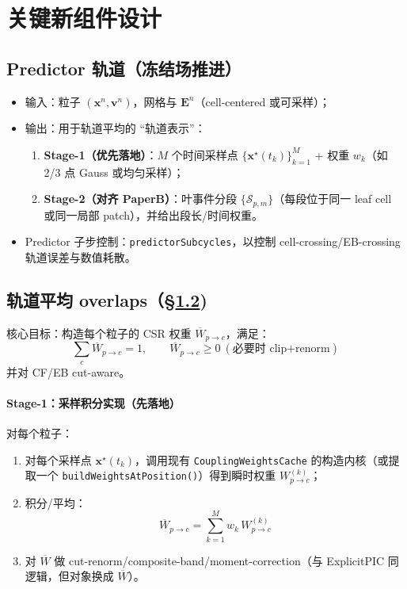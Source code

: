 \documentclass[UTF8,a4paper,12pt]{ctexart}
\newcommand{\code}[1]{\texttt{#1}}
\begin{document}
\section{关键新组件设计}
\label{sec:keycomponents}

\subsection{Predictor 轨道（冻结场推进）}
\begin{itemize}[leftmargin=2em]
  \item 输入：粒子 $(\bm{x}^n,\bm{v}^n)$，网格与 $\bm{E}^n$（cell-centered 或可采样）；
  \item 输出：用于轨道平均的 ``轨道表示''：
  \begin{enumerate}[leftmargin=2em]
    \item \textbf{Stage-1（优先落地）}：$M$ 个时间采样点 $\{\bm{x}^\star(t_k)\}_{k=1}^M$ + 权重 $w_k$（如 2/3 点 Gauss 或均匀采样）；
    \item \textbf{Stage-2（对齐 PaperB）}：叶事件分段 $\{\mathcal{S}_{p,m}\}$（每段位于同一 leaf cell 或同一局部 patch），并给出段长/时间权重。
  \end{enumerate}
  \item Predictor 子步控制：\code{predictorSubcycles}，以控制 cell-crossing/EB-crossing 轨道误差与数值耗散。
\end{itemize}

\subsection{轨道平均 overlaps（\S\ref{sec:orbitavg})}
\label{sec:orbitavg}
核心目标：构造每个粒子的 CSR 权重 $\overline{W}_{p\to c}$，满足：
\[
\sum_c \overline{W}_{p\to c}=1,\qquad \overline{W}_{p\to c}\ge 0 \ (\text{必要时 clip+renorm})
\]
并对 CF/EB cut-aware。

\paragraph{Stage-1：采样积分实现（先落地）}
对每个粒子：
\begin{enumerate}[leftmargin=2em]
  \item 对每个采样点 $\bm{x}^\star(t_k)$，调用现有 \code{CouplingWeightsCache} 的构造内核（或提取一个 \code{buildWeightsAtPosition()}）得到瞬时权重 $W^{(k)}_{p\to c}$；
  \item 积分/平均：
  \[
    \overline{W}_{p\to c}=\sum_{k=1}^M w_k\,W^{(k)}_{p\to c}
  \]
  \item 对 $\overline{W}$ 做 cut-renorm/composite-band/moment-correction（与 ExplicitPIC 同逻辑，但对象换成 $\overline{W}$）。
\end{enumerate}
\end{document}
